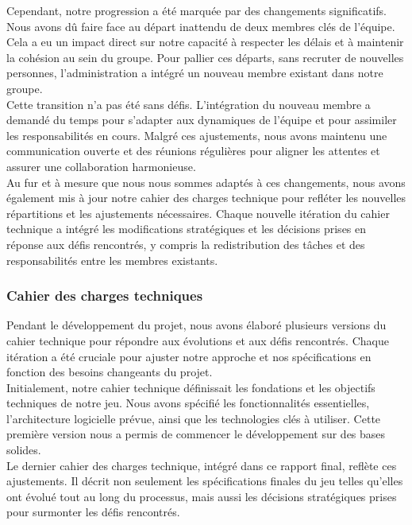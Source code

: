 Cependant, notre progression a été marquée par des changements significatifs. 
Nous avons dû faire face au départ inattendu de deux membres clés de l'équipe. 
Cela a eu un impact direct sur notre capacité à respecter les délais et à maintenir la cohésion au sein du groupe. Pour pallier ces départs, sans recruter de nouvelles personnes, l'administration a intégré un nouveau membre existant dans notre groupe.
\\

Cette transition n'a pas été sans défis. L'intégration du nouveau membre a demandé du temps pour s'adapter aux dynamiques de l'équipe et pour assimiler les responsabilités en cours. Malgré ces ajustements, nous avons maintenu une communication ouverte et des réunions régulières pour aligner les attentes et assurer une collaboration harmonieuse.
\\

Au fur et à mesure que nous nous sommes adaptés à ces changements, 
nous avons également mis à jour notre cahier des charges technique pour refléter les nouvelles répartitions et les ajustements nécessaires. 
Chaque nouvelle itération du cahier technique a intégré les modifications stratégiques et les décisions prises en réponse aux défis rencontrés,
 y compris la redistribution des tâches et des responsabilités entre les membres existants.
\\

\subsubsection{Cahier des charges techniques}
Pendant le développement du projet, nous avons élaboré plusieurs versions du cahier technique pour répondre aux évolutions et aux défis rencontrés. Chaque itération a été cruciale pour ajuster notre approche et nos spécifications en fonction des besoins changeants du projet. 
\\

Initialement, notre cahier technique définissait les fondations et les objectifs techniques de notre jeu. Nous avons spécifié les fonctionnalités essentielles, l'architecture logicielle prévue, ainsi que les technologies clés à utiliser. Cette première version nous a permis de commencer le développement sur des bases solides. 
\\

 


Le dernier cahier des charges technique, intégré dans ce rapport final, reflète ces ajustements. Il décrit non seulement les spécifications finales du jeu telles qu'elles ont évolué tout au long du processus, mais aussi les décisions stratégiques prises pour surmonter les défis rencontrés. 